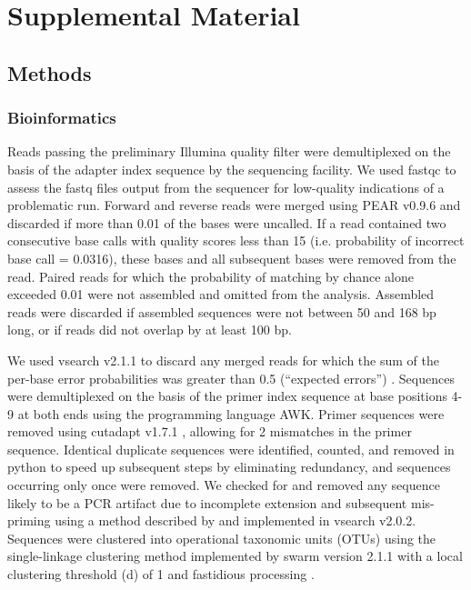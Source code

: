 \documentclass[11pt,letterpaper]{article} %
\begin{document}
\pagebreak
\section*{Supplemental Material}
\label{supplement}


\subsection*{Methods}
\subsubsection*{Bioinformatics}
Reads passing the preliminary Illumina quality filter were demultiplexed on the basis of the adapter index sequence by the sequencing facility. We used fastqc to assess the fastq files output from the sequencer for low-quality indications of a problematic run. Forward and reverse reads were merged using PEAR v0.9.6 \cite{Zhang2014} and discarded if more than 0.01 of the bases were uncalled. If a read contained two consecutive base calls with quality scores less than 15 (i.e. probability of incorrect base call = 0.0316), these bases and all subsequent bases were removed from the read. Paired reads for which the probability of matching by chance alone exceeded 0.01 were not assembled and omitted from the analysis. Assembled reads were discarded if assembled sequences were not between 50 and 168 bp long, or if reads did not overlap by at least 100 bp.


We used vsearch v2.1.1 \citep{vsearch} to discard any merged reads for which the sum of the per-base error probabilities was greater than 0.5 (``expected errors'') \cite{Edgar2010}. Sequences were demultiplexed on the basis of the primer index sequence at base positions 4-9 at both ends using the programming language AWK. Primer sequences were removed using cutadapt v1.7.1 \cite{Martin2011}, allowing for 2 mismatches in the primer sequence. Identical duplicate sequences were identified, counted, and removed in python to speed up subsequent steps by eliminating redundancy, and sequences occurring only once were removed. We checked for and removed any sequence likely to be a PCR artifact due to incomplete extension and subsequent mis-priming using a method described by \citet{Edgar2010} and implemented in vsearch v2.0.2. Sequences were clustered into operational taxonomic units (OTUs) using the single-linkage clustering method implemented by swarm version 2.1.1 with a local clustering threshold (d) of 1 and fastidious processing \citep{swarm}.
\end{document}
